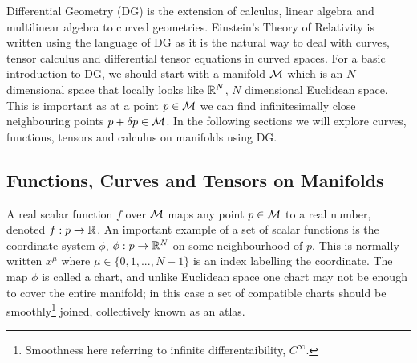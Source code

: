 Differential Geometry (DG) is the extension of calculus, linear algebra and multilinear algebra to curved
geometries. Einstein’s Theory of Relativity is written using the language of DG as it is the natural
way to deal with curves, tensor calculus and differential tensor equations in curved spaces. For a basic
introduction to DG, we should start with a manifold $\mathcal{M}$ which is an $N$ dimensional space that locally looks
like $\mathbb{R}^N$, $N$ dimensional Euclidean space. This is important as at a point $p\in\mathcal{M}$ we can find infinitesimally
close neighbouring points $p + \delta p \in \mathcal{M}$. In the following sections we will explore curves, functions, tensors and calculus on manifolds using DG.




\subsection{Functions, Curves and Tensors on Manifolds}
A real scalar function $f$ over $\mathcal{M}$ maps any point $p\in \mathcal{M}$ to a real number, denoted
$f : p \rightarrow \mathbb{R}$. An important example of a set of scalar functions is the coordinate system $\phi$, $\phi : p \rightarrow \mathbb{R}^N$ { \color{orchid} on some neighbourhood of $p$}. This is normally written $x^\mu$ where $\mu\in\{0,1,...,N-1\}$ is an index labelling the coordinate. The map $\phi$ is called a chart,
and unlike Euclidean space one chart may not be enough to cover the entire manifold; in this case a set
of compatible charts should be smoothly\footnote{\color{orchid} Smoothness here referring to infinite differentaibility, $C^\infty$.} joined, collectively known as an atlas.

